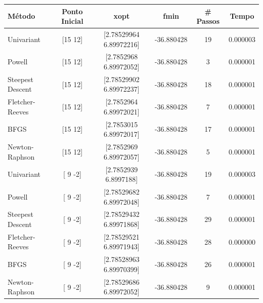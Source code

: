 \documentclass[12pt]{article}
\begin{document}
\begin{table}[H]
\begin{tabular}{lccccc}
  \hline
  \textbf{Método} & \textbf{Ponto Inicial} & \textbf{xopt} & \textbf{fmin} & \textbf{\# Passos} & \textbf{Tempo} \\
  \hline
  Univariant & [15 12] & [2.78529964 6.89972216] & -36.880428 & 19 & 0.000003 \\
  Powell & [15 12] & [2.7852968  6.89972052] & -36.880428 & 3 & 0.000001 \\
  Steepest Descent & [15 12] & [2.78529902 6.89972237] & -36.880428 & 18 & 0.000001 \\
  Fletcher-Reeves & [15 12] & [2.7852964  6.89972021] & -36.880428 & 7 & 0.000001 \\
  BFGS & [15 12] & [2.7853015  6.89972017] & -36.880428 & 17 & 0.000001 \\
  Newton-Raphson & [15 12] & [2.7852969  6.89972057] & -36.880428 & 5 & 0.000001 \\\hline
  Univariant & [ 9 -2] & [2.7852939 6.8997188] & -36.880428 & 19 & 0.000003 \\
  Powell & [ 9 -2] & [2.78529682 6.89972048] & -36.880428 & 7 & 0.000001 \\
  Steepest Descent & [ 9 -2] & [2.78529432 6.89971868] & -36.880428 & 29 & 0.000001 \\
  Fletcher-Reeves & [ 9 -2] & [2.78529521 6.89971943] & -36.880428 & 28 & 0.000000 \\
  BFGS & [ 9 -2] & [2.78528963 6.89970399] & -36.880428 & 26 & 0.000001 \\
  Newton-Raphson & [ 9 -2] & [2.78529686 6.89972052] & -36.880428 & 9 & 0.000001 \\
  \hline
  \end{tabular}
\end{table}
\end{document}
